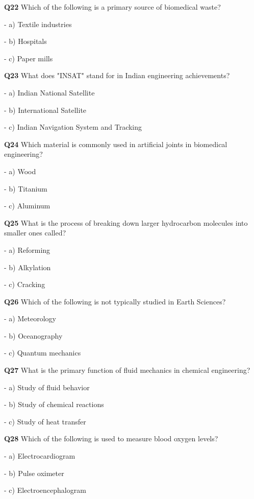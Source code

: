 \textbf{Q22} Which of the following is a primary source of biomedical waste?\par
\quad - a) Textile industries\par
\quad - b) Hospitals\par
\quad - c) Paper mills\par

\textbf{Q23} What does "INSAT" stand for in Indian engineering achievements?\par
\quad - a) Indian National Satellite\par
\quad - b) International Satellite\par
\quad - c) Indian Navigation System and Tracking\par

\textbf{Q24} Which material is commonly used in artificial joints in biomedical engineering?\par
\quad - a) Wood\par
\quad - b) Titanium\par
\quad - c) Aluminum\par

\textbf{Q25} What is the process of breaking down larger hydrocarbon molecules into smaller ones called?\par
\quad - a) Reforming\par
\quad - b) Alkylation\par
\quad - c) Cracking\par

\textbf{Q26} Which of the following is not typically studied in Earth Sciences?\par
\quad - a) Meteorology\par
\quad - b) Oceanography\par
\quad - c) Quantum mechanics\par

\textbf{Q27} What is the primary function of fluid mechanics in chemical engineering?\par
\quad - a) Study of fluid behavior\par
\quad - b) Study of chemical reactions\par
\quad - c) Study of heat transfer\par

\textbf{Q28} Which of the following is used to measure blood oxygen levels?\par
\quad - a) Electrocardiogram\par
\quad - b) Pulse oximeter\par
\quad - c) Electroencephalogram\par

